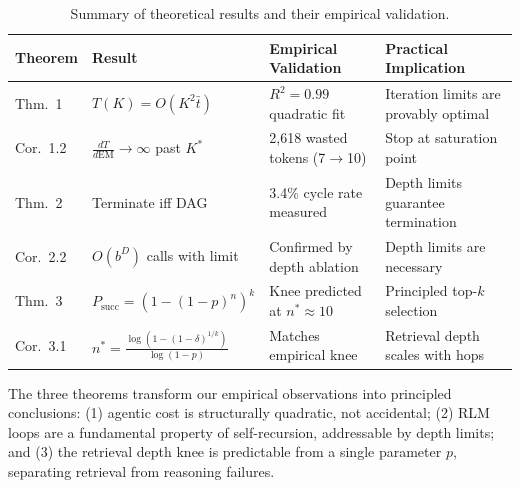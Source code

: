 \begin{table}[t]
\centering
\small
\begin{tabular}{llp{3.5cm}p{3cm}}
\toprule
\textbf{Theorem} & \textbf{Result} & \textbf{Empirical Validation} & \textbf{Practical Implication} \\
\midrule
Thm.\ 1 & $T(K) = O(K^2\bar{t})$ & $R^2=0.99$ quadratic fit & Iteration limits are provably optimal \\
Cor.\ 1.2 & $\frac{dT}{d\text{EM}} \to \infty$ past $K^*$ & 2,618 wasted tokens (7$\to$10) & Stop at saturation point \\
Thm.\ 2 & Terminate iff DAG & 3.4\% cycle rate measured & Depth limits guarantee termination \\
Cor.\ 2.2 & $O(b^D)$ calls with limit & Confirmed by depth ablation & Depth limits are necessary \\
Thm.\ 3 & $P_{\text{succ}} = (1-(1-p)^n)^k$ & Knee predicted at $n^*\approx 10$ & Principled top-$k$ selection \\
Cor.\ 3.1 & $n^* = \frac{\log(1-(1-\delta)^{1/k})}{\log(1-p)}$ & Matches empirical knee & Retrieval depth scales with hops \\
\bottomrule
\end{tabular}
\caption{Summary of theoretical results and their empirical validation.}
\label{tab:theory_summary}
\end{table}

The three theorems transform our empirical observations into principled conclusions: (1) agentic cost is structurally quadratic, not accidental; (2) RLM loops are a fundamental property of self-recursion, addressable by depth limits; and (3) the retrieval depth knee is predictable from a single parameter $p$, separating retrieval from reasoning failures.
